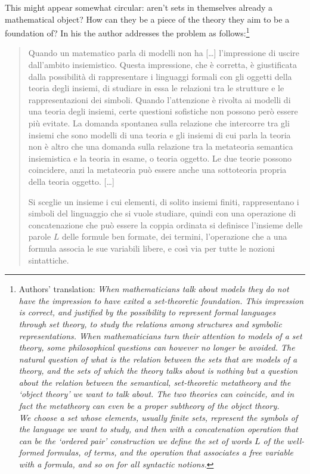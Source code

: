 This might appear somewhat circular: aren't sets in themselves already a mathematical object? How can they be a piece of the theory they aim to be a foundation of? In his \cite{lolli1977categorie} the author addresses the problem as follows:\footnote{Authors' translation: \emph{When mathematicians talk about models they do not have the impression to have exited a set-theoretic foundation. This impression is correct, and justified by the possibility to represent formal languages through set theory, to study the relations among structures and symbolic representations. When mathematicians turn their attention to models of a set theory, some philosophical questions can however no longer be avoided. The natural question of what is the relation between the sets that are models of a theory, and the sets of which the theory talks about is nothing but a question about the relation between the semantical, set-theoretic metatheory and the `object theory' we want to talk about. The two theories can coincide, and in fact the metatheory can even be a proper subtheory of the object theory.\\
\indent We choose a set whose elements, usually finite sets, represent the symbols of the language we want to study, and then with a concatenation operation that can be the `ordered pair' construction we define the set of words $L$ of the well-formed formulas, of terms, and the operation that associates a free variable with a formula, and so on for all syntactic notions.}}
\begin{quote}
    Quando un matematico parla di modelli non ha [\dots\unkern] l'impressione di uscire dall'ambito insiemistico. Questa impressione, che è corretta, è giustificata dalla possibilità di rappresentare i linguaggi formali con gli oggetti della teoria degli insiemi, di studiare in essa le relazioni tra le strutture e le rappresentazioni dei simboli. Quando l'attenzione è rivolta ai modelli di una teoria degli insiemi, certe questioni sofistiche non possono però essere più evitate. La domanda spontanea sulla relazione che intercorre tra gli insiemi che so­no modelli di una teoria e gli insiemi di cui parla la teoria non è altro che una domanda sulla relazione tra la metateoria semantica insiemi­stica e la teoria in esame, o teoria oggetto. Le due teorie possono coincidere, anzi la metateoria può essere anche una sottoteoria pro­pria della teoria oggetto. [\dots\unkern]

    Si sceglie un insieme i cui elementi, di solito insiemi finiti, rappresentano i simboli del linguaggio che si vuole studiare, quindi con una operazione di concatenazione che può essere la coppia ordinata si definisce l'insieme delle parole $L$ delle for­mule ben formate, dei termini, l'operazione che a una formula asso­cia le sue variabili libere, e così via per tutte le nozioni sintattiche.
\end{quote}
